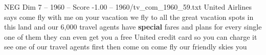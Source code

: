 \begin{textsample}{NEG Dim 7 – 1960 – Score -1.00 – 1960/tv\_com\_1960\_59.txt}  \label{ex:f7_neg_073}
United Airlines says come fly with me on your vacation we fly to all the great vacation spots in this land and our 6,000 travel agents have \textbf{special} fares and plans for every single one of them they can even get you a free United credit card so you can charge it see one of our travel agents first then come on come fly our friendly skies you

\end{textsample}
